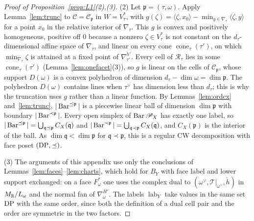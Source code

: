 \begin{proof}[Proof of Proposition~\ref{prop:L1}(2),(3)]
(2) Let ${\mathfrak p}=(\tau,\omega)$. Apply Lemma~\ref{lem:trunc} to $\mathcal C=\mathcal C_{\mathfrak p}$ in $W=V_\tau^*$, with
$g(\zeta)=\langle\zeta,x_0\rangle-\min_{y\in\nabla_\tau}\langle\zeta,y\rangle$ for a point $x_0$ in the relative interior of
$\nabla_\tau$. This $g$ is convex and positively homogeneous, positive off $0$ because a nonzero $\zeta\in V_\tau^*$ is not
constant on the $d_\tau$-dimensional affine space of $\nabla_\tau$, and linear on every cone $\operatorname{cone}_\tau(\tau')$,
on which $\min_{\nabla_\tau}\zeta$ is attained at a fixed point of $\nabla^{\check h'}_{\tau'}$. Every cell of $\mathcal R_\tau$
lies in some $\operatorname{cone}_\tau(\tau')$ (Lemma~\ref{lem:onefacet}(3)), so $g$ is linear on the cells of $\mathcal C_{\mathfrak p}$,
whose support $D(\omega)$ is a convex polyhedron of dimension $d_\tau-\dim\omega=\dim{\mathfrak p}$. The polyhedron $D(\omega)$ contains
lines when $\tau^\vee$ has dimension less than $d_\tau$; this is why the truncation uses $g$ rather than a linear function.
By Lemmas~\ref{lem:ordcx} and~\ref{lem:trunc}, $|\operatorname{Bar}^{\preceq {\mathfrak p}}|$ is a piecewise linear ball of dimension $\dim{\mathfrak p}$ with
boundary $|\operatorname{Bar}^{\prec {\mathfrak p}}|$. Every open simplex of $\operatorname{Bar}\mathscr P_X$ has exactly one label, so $|\operatorname{Bar}^{\preceq
{\mathfrak p}}|=\bigcup_{{\mathfrak q}\preceq {\mathfrak p}}C_X({\mathfrak q})$ and $|\operatorname{Bar}^{\prec {\mathfrak p}}|=\bigcup_{{\mathfrak q}\prec {\mathfrak p}}C_X({\mathfrak q})$, and $C_X({\mathfrak p})$ is the interior of the ball.
As $\dim{\mathfrak q}<\dim{\mathfrak p}$ for ${\mathfrak q}\prec {\mathfrak p}$, this is a regular CW decomposition with face poset $(\mathrm{DP},\preceq)$.

(3) The arguments of this appendix use only the conclusions of Lemmas~\ref{lem:faces}--\ref{lem:charts}, which hold for
$B_Y$ with face label and lower support exchanged: on a face $F^*_\omega$ one uses the complex dual to
$(\omega^\vee,\mathcal T|_{\omega^\vee},\check h)$ in $M_\mathbb R/L_\omega$ and the normal fan of $\nabla^{H'}_\omega$. The labels
$\operatorname{lab}_Y$ take values in the same set $\mathrm{DP}$ with the same order, since both the definition of a dual cell pair and the order
are symmetric in the two factors.
\end{proof}

